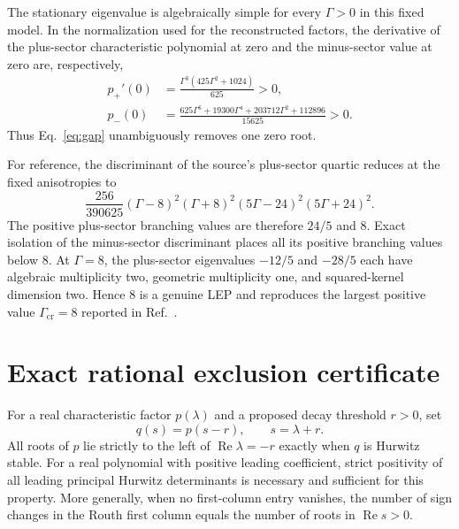 \documentclass[aps,pra,reprint,superscriptaddress,nofootinbib]{revtex4-2}
\begin{document}
The stationary eigenvalue is algebraically simple for every $\Gamma>0$ in
this fixed model.  In the normalization used for the reconstructed factors,
the derivative of the plus-sector characteristic polynomial at zero and the
minus-sector value at zero are, respectively,
\begin{align}
 p_+'(0)&=\frac{\Gamma^3(425\Gamma^2+1024)}{625}>0,\\
 p_-(0)&=\frac{625\Gamma^6+19300\Gamma^4+203712\Gamma^2+112896}{15625}>0.
                                                                            \label{eq:zero}
\end{align}
Thus Eq.~\eqref{eq:gap} unambiguously removes one zero root.

For reference, the discriminant of the source's plus-sector quartic reduces
at the fixed anisotropies to
\begin{equation}
 \frac{256}{390625}(\Gamma-8)^2(\Gamma+8)^2
 (5\Gamma-24)^2(5\Gamma+24)^2 .                                             \label{eq:disc}
\end{equation}
The positive plus-sector branching values are therefore $24/5$ and $8$.
Exact isolation of the minus-sector discriminant places all its positive
branching values below $8$.  At $\Gamma=8$, the plus-sector eigenvalues
$-12/5$ and $-28/5$ each have algebraic multiplicity two, geometric
multiplicity one, and squared-kernel dimension two.  Hence $8$ is a genuine
LEP and reproduces the largest positive value
$\Gamma_{\mathrm{cr}}=8$ reported in Ref.~\cite{Popkov2025}.

\section{Exact rational exclusion certificate}

For a real characteristic factor $p(\lambda)$ and a proposed decay threshold
$r>0$, set
\begin{equation}
 q(s)=p(s-r),\qquad s=\lambda+r.                                             \label{eq:shift}
\end{equation}
All roots of $p$ lie strictly to the left of
$\operatorname{Re}\lambda=-r$ exactly when $q$ is Hurwitz stable.  For a
real polynomial with positive leading coefficient, strict positivity of all
leading principal Hurwitz determinants is necessary and sufficient for this
property.  More generally, when no first-column entry vanishes, the number of
sign changes in the Routh first column equals the number of roots in
$\operatorname{Re}s>0$.
\end{document}
